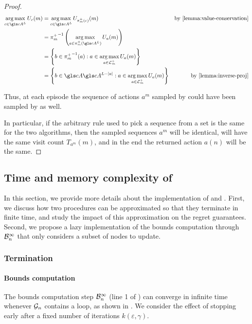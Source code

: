 \begin{subappendices}
\begin{proof}
	\begin{align*}
	\argmax_{c\in \cA^L} U_c(m) &= \argmax_{c\in \cA^L} U_{\pi_m^+(c)}(m) & \text{by \Cref{lemma:value-conservation}} \\
	&= {\pi_m^+}^{-1}\left(\argmax_{a\in {\pi_m^+}(\cA^L)} U_{a}(m)\right) & \\
	&= \left\{b\in{\pi_m^+}^{-1}(a) : a\in \argmax_{a\in \LL_m^+} U_{a}(m)\right\} & \\
	&= \left\{b\in \cA \cA^{L-|a|} : a\in \argmax_{a\in \LL_m^+} U_{a}(m)\right\} & \text{by \Cref{lemma:inverse-proj}} 
	\end{align*}
	
	Thus, at each episode the sequence of actions $a^m$ sampled by  could have been sampled by  as well.
	
	In particular, if the arbitrary rule used to pick a sequence from a set is the same for the two algorithms, then the sampled sequences $a^m$ will be identical, will have the same visit count $T_{a^m}(m)$, and in the end the returned action $a(n)$ will be the same.
\end{proof}

\subsection{Time and memory complexity of \GBOP}
\label{sec:gbop-implementation}

In this section, we provide more details about the implementation of \GBOPD and \GBOP. First, we discuss how two procedures can be approximated so that they terminate in finite time, and study the impact of this approximation on the regret guarantees. Second, we propose a lazy implementation of the bounds computation through $\mathcal{B}_n^\infty$ that only considers a subset of nodes to update.

\subsubsection{Termination}

\paragraph{Bounds computation}

The bounds computation step $\mathcal{B}_n^\infty$ (line 1 of \GBOPD) can converge in infinite time whenever $\mathcal{G}_n$ contains a loop, as shown in . We consider the effect of stopping early after a fixed number of iterations $k(\varepsilon,\gamma)$.


\end{subappendices}
